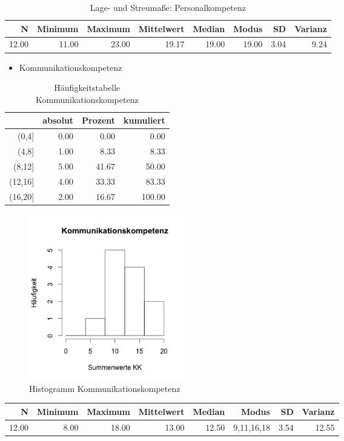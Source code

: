 \documentclass[12pt, bibliography=totoc]{scrartcl}
\begin{document}
\begin{table}[H]
\centering
\caption{Lage- und Streumaße: Personalkompetenz}
\begin{tabular}{rrrrrrrr}
  \hline
  N & Minimum & Maximum & Mittelwert & Median & Modus & SD & Varianz \\
  \hline
  12.00 & 11.00 & 23.00 & 19.17 & 19.00 & 19.00 & 3.04 & 9.24 \\
   \hline
\end{tabular}
\end{table}

\begin{itemize}
\tightlist
\item
  Kommunikationskompetenz
\end{itemize}

\begin{table}[H]
\centering
\caption{Häufigkeitstabelle Kommunikationskompetenz}
\begin{tabular}{rrrr}
  \hline
 & absolut & Prozent & kumuliert \\
  \hline
(0,4] & 0.00 & 0.00 & 0.00 \\
  (4,8] & 1.00 & 8.33 & 8.33 \\
  (8,12] & 5.00 & 41.67 & 50.00 \\
  (12,16] & 4.00 & 33.33 & 83.33 \\
  (16,20] & 2.00 & 16.67 & 100.00 \\
   \hline
\end{tabular}
\end{table}

\begin{figure}[H]
\centering
\caption{Histogramm Kommunikationskompetenz}
\includegraphics[width=0.33\textwidth]{Anhang/KKHist.png}
\end{figure}

\begin{table}[ht]
\centering
\begin{tabular}{rrrrrrrr}
  \hline
  N & Minimum & Maximum & Mittelwert & Median & Modus & SD & Varianz \\
  \hline
 12.00 & 8.00 & 18.00 & 13.00 & 12.50 & 9,11,16,18 & 3.54 & 12.55 \\

\end{tabular}
\end{table}
\end{document}
